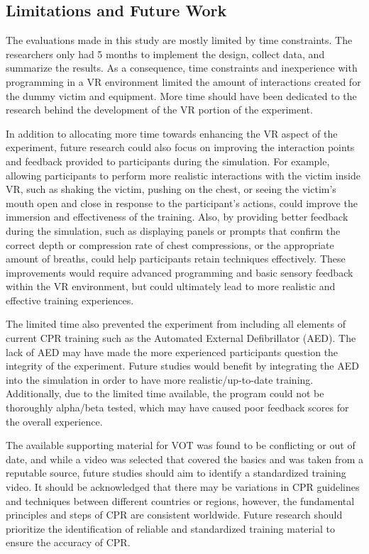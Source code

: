 \documentclass[manuscript]{./Models/acmart}
\begin{document}
\subsection{Limitations and Future Work}
The evaluations made in this study are mostly limited by time constraints. The researchers only had 5 months to implement the design, collect data, and summarize the results. As a consequence, time constraints and inexperience with programming in a VR environment limited the amount of interactions created for the dummy victim and equipment. More time should have been dedicated to the research behind the development of the VR portion of the experiment. 

In addition to allocating more time towards enhancing the VR aspect of the experiment, future research could also focus on improving the interaction points and feedback provided to participants during the simulation. For example, allowing participants to perform more realistic interactions with the victim inside VR, such as shaking the victim, pushing on the chest, or seeing the victim's mouth open and close in response to the participant's actions, could improve the immersion and effectiveness of the training. Also, by providing better feedback during the simulation, such as displaying panels or prompts that confirm the correct depth or compression rate of chest compressions, or the appropriate amount of breaths, could help participants retain techniques effectively. These improvements would require advanced programming and basic sensory feedback within the VR environment, but could ultimately lead to more realistic and effective training experiences.

The limited time also prevented the experiment from including all elements of current CPR training such as the Automated External Defibrillator (AED). The lack of AED may have made the more experienced participants question the integrity of the experiment. Future studies would benefit by integrating the AED into the simulation in order to have more realistic/up-to-date training. Additionally, due to the limited time available, the program could not be thoroughly alpha/beta tested, which may have caused poor feedback scores for the overall experience. 

The available supporting material for VOT was found to be conflicting or out of date, and while a video was selected that covered the basics and was taken from a reputable source, future studies should aim to identify a standardized training video. It should be acknowledged that there may be variations in CPR guidelines and techniques between different countries or regions, however, the fundamental principles and steps of CPR are consistent worldwide. Future research should prioritize the identification of reliable and standardized training material to ensure the accuracy of CPR.
\end{document}
